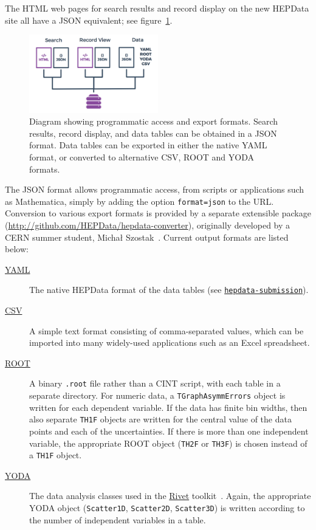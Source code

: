 \documentclass[a4paper]{jpconf}
\begin{document}
The HTML web pages for search results and record display on the new HEPData site all have a JSON equivalent; see figure~\ref{fig:programmatic}.
%
\begin{figure}
  \begin{center}
    \includegraphics[width=0.5\textwidth]{Figures/programmatic_content.pdf}\hspace{2pc}%
    \begin{minipage}[b]{14pc}
      \caption{\label{fig:programmatic}Diagram showing programmatic access and export formats.  Search results, record display, and data tables can be obtained in a JSON format.  Data tables can be exported in either the native YAML format, or converted to alternative CSV, ROOT and YODA formats.}
    \end{minipage}
  \end{center}
\end{figure}
%
The JSON format allows programmatic access, from scripts or applications such as Mathematica, simply by adding the option \texttt{format=json} to the URL.  Conversion to various export formats is provided by a separate extensible package (\url{http://github.com/HEPData/hepdata-converter}), originally developed by a CERN summer student, Micha\l{} Szostak~\cite{Szostak:2055193}.  Current output formats are listed below:
%
\begin{description}
\item [\href{http://yaml.org}{YAML}] The native HEPData format of the data tables (see \href{http://github.com/HEPData/hepdata-submission}{\texttt{hepdata-submission}}).
\item [\href{https://en.wikipedia.org/wiki/Comma-separated_values}{CSV}] A simple text format consisting of comma-separated values, which can be imported into many widely-used applications such as an Excel spreadsheet.
\item [\href{https://root.cern.ch}{ROOT}] A binary \texttt{.root} file rather than a CINT script, with each table in a separate directory.  For numeric data, a \texttt{TGraphAsymmErrors} object is written for each dependent variable.  If the data has finite bin widths, then also separate \texttt{TH1F} objects are written for the central value of the data points and each of the uncertainties.  If there is more than one independent variable, the appropriate ROOT object (\texttt{TH2F} or \texttt{TH3F}) is chosen instead of a \texttt{TH1F} object.
\item [\href{https://yoda.hepforge.org}{YODA}] The data analysis classes used in the \href{https://rivet.hepforge.org}{Rivet} toolkit~\cite{Buckley:2010ar}.  Again, the appropriate YODA object (\texttt{Scatter1D}, \texttt{Scatter2D}, \texttt{Scatter3D}) is written according to the number of independent variables in a table.
\end{description}
\end{document}
